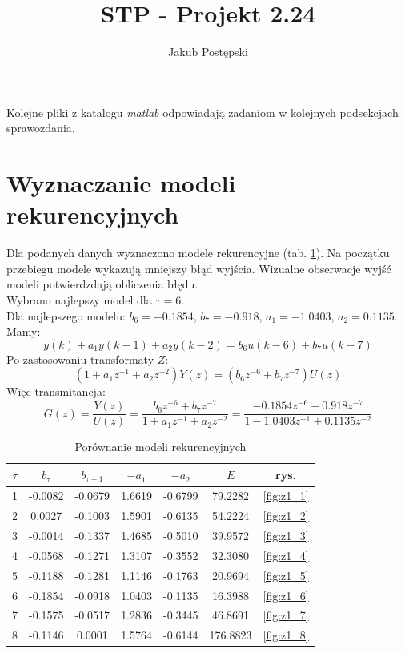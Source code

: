 \documentclass[a4paper, 10pt]{article}
\author{Jakub Postępski}
\title{STP - Projekt 2.24}
\begin{document}
	\maketitle
	Kolejne pliki z katalogu \textit{matlab} odpowiadają zadaniom w kolejnych podsekcjach sprawozdania.
	\section{Wyznaczanie modeli rekurencyjnych}
	Dla podanych danych wyznaczono modele rekurencyjne (tab. \ref{tab:z1}). Na początku przebiegu modele wykazują mniejszy błąd wyjścia. Wizualne obserwacje wyjść modeli potwierdzdają obliczenia błędu. \\
	Wybrano najlepszy model dla $\tau=6$. \\
	Dla najlepszego modelu: $b_6 = -0.1854$, $b_7=-0.918$, $a_1=-1.0403$, $a_2=0.1135$.\\
	Mamy:
	\[y(k)+a_1y(k-1) + a_2y(k-2)=b_6u(k-6)+b_7u(k-7)\]
	Po zastosowaniu transformaty $Z$:
	\[(1+a_1z^{-1} + a_2z^{-2})Y(z)=(b_6z^{-6}+b_7z^{-7})U(z)\]
	Więc transmitancja:
	\[G(z)=\frac{Y(z)}{U(z)}=\frac{b_6z^{-6}+b_7z^{-7}}{1+a_1z^{-1} + a_2z^{-2}}=\frac{-0.1854z^{-6}-0.918z^{-7}}{1-1.0403z^{-1} + 0.1135z^{-2}}\]
	\begin{table}[H]
	\centering
	\begin{tabular}{|c|c|c|c|c|c|c|}
	\hline 
	$\tau$ & $b_\tau$ & $b_{\tau+1}$ & $-a_1$ & $-a_2$ & $E$ & rys. \\ 
	\hline 
	 1 & -0.0082 & -0.0679 &  1.6619 & -0.6799
	  & 79.2282 & \ref{fig:z1_1}\\ 
	\hline 
	2 & 0.0027 & -0.1003
	  &  1.5901 & -0.6135 & 54.2224 & \ref{fig:z1_2}\\ 
	\hline 3 & -0.0014 & -0.1337 &  1.4685  & -0.5010 & 39.9572 & \ref{fig:z1_3}\\ 
	\hline 
	4 & -0.0568 & -0.1271 & 1.3107 & -0.3552
	  & 32.3080  & \ref{fig:z1_4}\\ 
	\hline 
 5 & -0.1188 & -0.1281 & 1.1146 &  -0.1763 & 20.9694 & \ref{fig:z1_5} \\ 
	\hline 
	6 & -0.1854  &  -0.0918 &  1.0403  & -0.1135 & 16.3988 &\ref{fig:z1_6} \\ 
	\hline 
	7 & -0.1575 & -0.0517  & 1.2836 & -0.3445  & 46.8691
	&\ref{fig:z1_7} \\ 
	\hline
	8 & -0.1146 & 0.0001  & 1.5764 & -0.6144 & 176.8823 & \ref{fig:z1_8} \\ 
	\hline 
	\end{tabular}
	\label{tab:z1}
	\caption{Porównanie modeli rekurencyjnych}
	\end{table}
	
\end{document}
